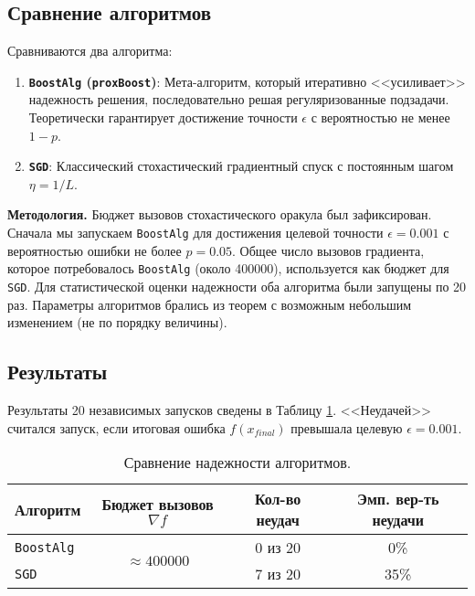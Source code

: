 \subsection{Сравнение алгоритмов}

Сравниваются два алгоритма:
\begin{enumerate}
    \item \textbf{\texttt{BoostAlg} (\texttt{proxBoost})}: Мета-алгоритм, который итеративно <<усиливает>> надежность решения, последовательно решая регуляризованные подзадачи. Теоретически гарантирует достижение точности $\epsilon$ с вероятностью не менее $1-p$.
    \item \textbf{\texttt{SGD}}: Классический стохастический градиентный спуск с постоянным шагом $\eta = 1/L$.
\end{enumerate}

\textbf{Методология.} Бюджет вызовов стохастического оракула был зафиксирован. Сначала мы запускаем \texttt{BoostAlg} для достижения целевой точности $\epsilon = 0.001$ с вероятностью ошибки не более $p = 0.05$. Общее число вызовов градиента, которое потребовалось \texttt{BoostAlg} (около 400000), используется как бюджет для \texttt{SGD}. Для статистической оценки надежности оба алгоритма были запущены по 20 раз. Параметры алгоритмов брались из теорем с возможным небольшим изменением (не по порядку величины).

\subsection{Результаты}

Результаты 20 независимых запусков сведены в Таблицу \ref{tab:reliability}. <<Неудачей>> считался запуск, если итоговая ошибка $f(x_{final})$ превышала целевую $\epsilon=0.001$.

\begin{table}[h!]
\centering
\begin{tabular}{|l|c|c|c|}
\hline
\textbf{Алгоритм} & \textbf{Бюджет вызовов $\nabla f$} & \textbf{Кол-во неудач} & \textbf{Эмп. вер-ть неудачи} \\ \hline
\texttt{BoostAlg} & \multirow{2}{*}{$\approx 400000$} & 0 из 20 & 0\% \\ \cline{1-1} \cline{3-4}
\texttt{SGD} &  & 7 из 20 & 35\% \\ \hline
\end{tabular}
\caption{Сравнение надежности алгоритмов.}
\label{tab:reliability}
\end{table}

